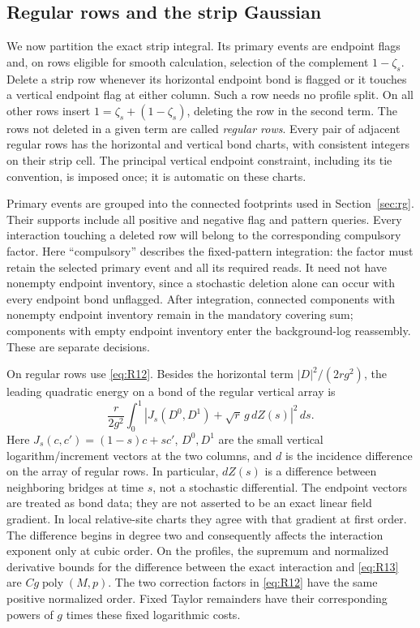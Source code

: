 \subsection{Regular rows and the strip Gaussian}

We now partition the exact strip integral.  Its primary events are
endpoint flags and, on rows eligible for smooth calculation, selection
of the complement $1-\zeta_s$.  Delete a strip row whenever its horizontal
endpoint bond is flagged or it touches a vertical endpoint flag at
either column.  Such a row needs no profile split.  On all other rows
insert $1=\zeta_s+(1-\zeta_s)$, deleting the row in the second term.
The rows not deleted in a given term are called \emph{regular rows}.
Every pair of adjacent regular rows has the horizontal and vertical
bond charts, with consistent integers on their strip cell.  The
principal vertical endpoint constraint, including its tie convention,
is imposed once; it is automatic on these charts.

Primary events are grouped into the connected footprints used in
Section~\ref{sec:rg}.  Their supports include all positive and negative
flag and pattern queries.  Every interaction touching a deleted row
will belong to the corresponding compulsory factor.  Here
``compulsory'' describes the fixed-pattern integration: the factor must
retain the selected primary event and all its required reads.  It need
not have nonempty endpoint inventory, since a stochastic deletion alone
can occur with every endpoint bond unflagged.  After integration,
connected components with nonempty endpoint inventory remain in the
mandatory covering sum; components with empty endpoint inventory enter
the background-log reassembly.  These are separate decisions.

On regular rows use \eqref{eq:R12}.  Besides the horizontal term
$|D|^2/(2rg^2)$, the leading quadratic energy on a bond of the regular
vertical array is
\begin{equation}
 \frac{r}{2g^2}\int_0^1
 \left|J_s(D^0,D^1)+\sqrt r\,g\,dZ(s)\right|^2\,ds.
 \label{eq:R13}
\end{equation}
Here $J_s(c,c')=(1-s)c+sc'$, $D^0,D^1$ are the small vertical
logarithm/increment vectors at the two columns, and $d$ is the incidence
difference on the array of regular rows.  In particular, $dZ(s)$ is a
difference between neighboring bridges at time $s$, not a stochastic
differential.  The endpoint vectors are treated as bond data; they are
not asserted to be an exact linear field gradient.
In local relative-site charts they agree with that gradient at first
order.  The difference begins in degree two and consequently affects
the interaction exponent only at cubic order.  On the profiles, the
supremum and normalized derivative bounds for the difference between
the exact interaction and \eqref{eq:R13} are
$Cg\operatorname{poly}(M,p)$.  The two correction factors in
\eqref{eq:R12} have the same positive normalized order.  Fixed Taylor
remainders have their corresponding powers of $g$ times these fixed
logarithmic costs.

